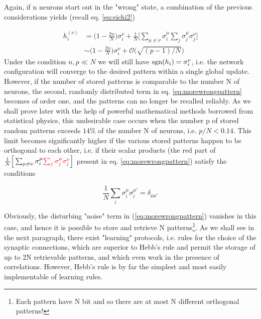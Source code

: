 Again, if n neurons start out in the "wrong" state, a combination of the previous considerations yields (recall eq. \ref{eq:eichi2})

\begin{equation}\begin{split}
    h_i^{(\nu)} &= \big(1-\frac{2n}{N}\big)\sigma_{i}^{\nu}+\frac{1}{N}\Big[\sum_{\mu \neq \nu}\sigma_{i}^\mu\sum_{j}\sigma_{j}^\mu\sigma_{j}^\nu \Big] \\
    &\sim \big(1-\frac{2n}{N}\big)\sigma_{i}^{\nu}+\mathcal{O}\Big(\sqrt{(p-1)/N}\Big)
    \end{split}
    \label{eq:morewrongpattern}
\end{equation}
Under the condition $n, p \ll N$ we will still have $\operatorname{sgn}(h_{i})=\sigma_{i}^{\nu}$, i.e. the network configuration will converge to the desired pattern within a single global update. However, if the number of stored patterns is comparable to the number N of neurons, the second, randomly distributed term in eq. \ref{eq:morewrongpattern} becomes of order one, and the patterns can no longer be recalled reliably. As we shall prove later with the help of powerful mathematical methods borrowed from statistical physics, this undesirable case occurs when the number p of stored random patterns exceeds $14\%$ of the number N of neurons, i.e. $p/N < 0.14$.
This limit becomes significantly higher if the various stored patterns happen to be orthogonal to each other, i.e. if their scalar products (the red part of $\frac{1}{N}\Big[\sum_{\mu \neq \nu}\sigma_{i}^\mu \textcolor{red}{\sum_{j}\sigma_{j}^\mu\sigma_{j}^\nu} \Big]$ present in eq. \ref{eq:morewrongpattern}) satisfy the conditions

\begin{equation}
    \frac{1}{N}\sum_{i}\sigma_{i}^\mu\sigma_{i}^{\mu'}=\delta_{\mu \mu'}
\end{equation}

Obviously, the disturbing "noise" term in (\ref{eq:morewrongpattern}) vanishes in this case, and hence it is possible to store and retrieve N patterns\footnote{Each pattern have N bit and so there are at most N different orthogonal patterns!}. 
As we shall see in the next paragraph, there exist "learning" protocols, i.e. rules for the choice of the synaptic connections, which are superior to Hebb's rule and permit the storage of up to 2N retrievable patterns, and which even work in the presence of correlations. However, Hebb's rule is by far the simplest and most easily implementable of learning rules.

